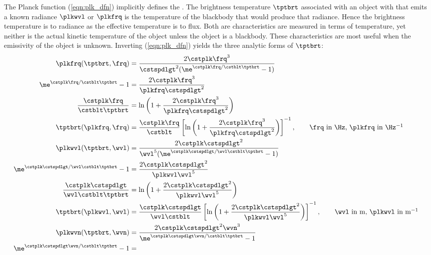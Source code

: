 \documentclass[12pt]{article}
\begin{document}
The Planck function (\ref{eqn:plk_dfn}) implicitly defines the
.
The brightness temperature $\tptbrt$ associated with an object with
that emits a known radiance $\plkwvl$ or $\plkfrq$ is the temperature
of the blackbody that would produce that radiance.
Hence the brightness temperature is to radiance as the effective
temperature is to flux.
Both are characteristics are measured in terms of temperature, yet
neither is the actual kinetic temperature of the object unless the
object is a blackbody.
These characteristics are most useful when the emissivity of the
object is unknown.
Inverting (\ref{eqn:plk_dfn}) yields the three analytic forms of
$\tptbrt$: 
\begin{subequations}
\label{eqn:tpt_brt_dfn}
\begin{align}
\label{eqn:tpt_brt_frq_dfn}
\plkfrq(\tptbrt,\frq) & = \frac{2 \cstplk \frq^{3}}{\cstspdlgt^{2} 
( \me^{\cstplk \frq / \cstblt \tptbrt} - 1)} \nonumber \\
\me^{\cstplk \frq / \cstblt \tptbrt} - 1 & =
\frac{2 \cstplk \frq^{3}}{\plkfrq \cstspdlgt^{2}} \nonumber \\
\frac{\cstplk \frq}{\cstblt \tptbrt} & =
\ln \left( 1 + \frac{ 2 \cstplk \frq^{3}}{\plkfrq \cstspdlgt^{2}} \right) \nonumber \\
\tptbrt(\plkfrq,\frq) & = \frac{\cstplk \frq}{\cstblt}
\left[ \ln \left( 1 + \frac{ 2 \cstplk \frq^{3}}{\plkfrq \cstspdlgt^{2}} \right) \right]^{-1},
\qquad \mbox{\frq\ in \Hz, \plkfrq\ in \Hz$^{-1}$} \\
\label{eqn:tpt_brt_wvl_dfn}
\plkwvl(\tptbrt,\wvl) & = \frac{2 \cstplk \cstspdlgt^{2}}{\wvl^{5} 
( \me^{\cstplk \cstspdlgt / \wvl \cstblt \tptbrt} - 1)} \nonumber \\
\me^{\cstplk \cstspdlgt / \wvl \cstblt \tptbrt} - 1 & =
\frac{2 \cstplk \cstspdlgt^{2}} {\plkwvl \wvl^{5}} \nonumber \\
\frac{\cstplk \cstspdlgt}{\wvl \cstblt \tptbrt} & =
\ln \left( 1 + \frac{2 \cstplk \cstspdlgt^{2}}{\plkwvl \wvl^{5}} \right) \nonumber \\
\tptbrt(\plkwvl,\wvl) & = \frac{\cstplk \cstspdlgt}{\wvl \cstblt}
\left[ \ln \left( 1 + \frac{2 \cstplk \cstspdlgt^{2}}{\plkwvl \wvl^{5}} \right) \right]^{-1},
\qquad \mbox{\wvl\ in m, \plkwvl\ in m$^{-1}$} \\ 
\label{eqn:tpt_brt_wvn_dfn}
\plkwvn(\tptbrt,\wvn) & = \frac{2 \cstplk \cstspdlgt^{2} \wvn^{3}}
{\me^{\cstplk \cstspdlgt \wvn / \cstblt \tptbrt} - 1} \nonumber \\
\me^{\cstplk \cstspdlgt \wvn / \cstblt \tptbrt} - 1 & =

\end{align}
\end{subequations}
\end{document}
